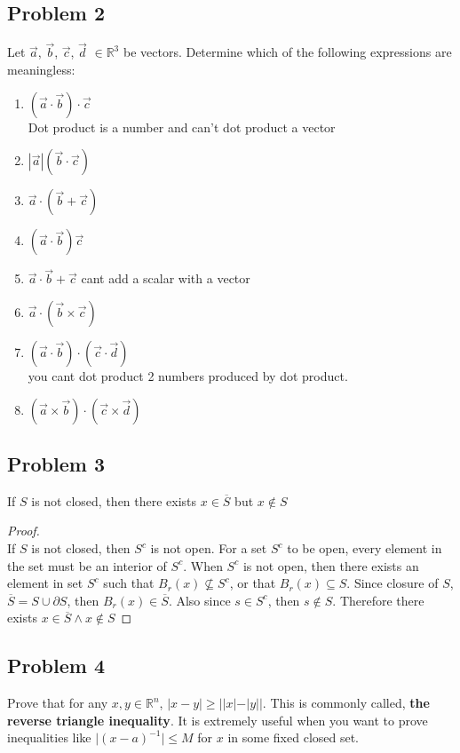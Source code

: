 \documentclass[11pt]{article}
\begin{document}
\subsection*{Problem 2}
Let $\vec{a}$, $\vec{b}$, $\vec{c}$, $\vec{d}$ $\in \mathbb{R}^{3}$ be vectors. Determine which of the following expressions are meaningless:
\begin{enumerate}
  \item $(\vec{a}\cdot \vec{b})\cdot \vec{c}$ \\
  Dot product is a number and can't dot product a vector
  \item $|\vec{a}|(\vec{b} \cdot \vec{c})$
  \item $\vec{a} \cdot(\vec{b}+ \vec{c})$
  \item $(\vec{a} \cdot \vec{b})\vec{c}$
  \item $\vec{a}\cdot \vec{b} + \vec{c}$
  cant add a scalar with a vector
  \item $\vec{a}\cdot (\vec{b}\times \vec{c})$
  \item $(\vec{a}\cdot \vec{b})\cdot (\vec{c}\cdot \vec{d})$ \\
  you cant dot product 2 numbers produced by dot product.
  \item $(\vec{a}\times \vec{b})\cdot (\vec{c}\times \vec{d})$
\end{enumerate}



\subsection*{Problem 3}
If $S$ is not closed, then there exists $x \in \overline{S}$ but $x \notin S$

\begin{proof}
  $ $\\
  If $S$ is not closed, then $S^c$ is not open. For a set $S^c$ to be open, every element in the set must be an interior of $S^c$. When $S^c$ is not open, then there exists an element in set $S^c$ such that $B_r(x) \not\subseteq S^c$, or that $B_r(x)\subseteq S$. Since closure of $S$, $\overline S = S\cup \partial S$, then $B_r(x)\in \overline S$. Also since $s\in S^c$, then $s\not\in S$. Therefore there exists $x\in \overline S \land x\not\in S$
\end{proof}


\subsection*{Problem 4}
Prove that for any $x,y \in \mathbb{R}^{n}$, $\vert x - y \vert \geq \big\vert \vert x \vert - \vert y \vert \big\vert$. This is commonly called, \textbf{the reverse triangle inequality}. It is extremely useful when you want to prove inequalities like $\vert (x-a)^{-1} \vert \leq M$ for $x$ in some fixed closed set.
\end{document}
